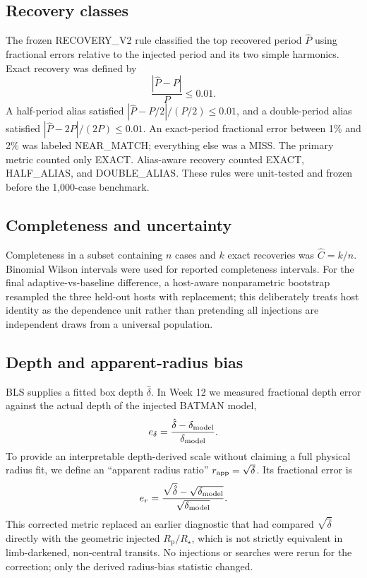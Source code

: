 \documentclass[11pt]{article}
\newcommand{\rprs}{$R_{\mathrm p}/R_\star$}
\begin{document}
\subsection{Recovery classes}
The frozen \textsc{RECOVERY\_V2} rule classified the top recovered period $\hat P$ using fractional errors relative to the injected period and its two simple harmonics. Exact recovery was defined by
\begin{equation}
\frac{|\hat P-P|}{P}\leq 0.01.
\end{equation}
A half-period alias satisfied $|\hat P-P/2|/(P/2)\leq0.01$, and a double-period alias satisfied $|\hat P-2P|/(2P)\leq0.01$. An exact-period fractional error between 1\% and 2\% was labeled \textsc{NEAR\_MATCH}; everything else was a \textsc{MISS}. The primary metric counted only \textsc{EXACT}. Alias-aware recovery counted \textsc{EXACT}, \textsc{HALF\_ALIAS}, and \textsc{DOUBLE\_ALIAS}. These rules were unit-tested and frozen before the 1,000-case benchmark.

\subsection{Completeness and uncertainty}
Completeness in a subset containing $n$ cases and $k$ exact recoveries was $\hat C=k/n$. Binomial Wilson intervals were used for reported completeness intervals. For the final adaptive-vs-baseline difference, a host-aware nonparametric bootstrap resampled the three held-out hosts with replacement; this deliberately treats host identity as the dependence unit rather than pretending all injections are independent draws from a universal population.

\subsection{Depth and apparent-radius bias}
BLS supplies a fitted box depth $\hat\delta$. In Week 12 we measured fractional depth error against the actual depth of the injected BATMAN model,
\begin{equation}
e_\delta=\frac{\hat\delta-\delta_{\rm model}}{\delta_{\rm model}}.
\end{equation}
To provide an interpretable depth-derived scale without claiming a full physical radius fit, we define an ``apparent radius ratio'' $r_{\rm app}=\sqrt{\delta}$. Its fractional error is
\begin{equation}
e_r=\frac{\sqrt{\hat\delta}-\sqrt{\delta_{\rm model}}}{\sqrt{\delta_{\rm model}}}.
\end{equation}
This corrected metric replaced an earlier diagnostic that had compared $\sqrt{\hat\delta}$ directly with the geometric injected \rprs, which is not strictly equivalent in limb-darkened, non-central transits. No injections or searches were rerun for the correction; only the derived radius-bias statistic changed.
\end{document}

